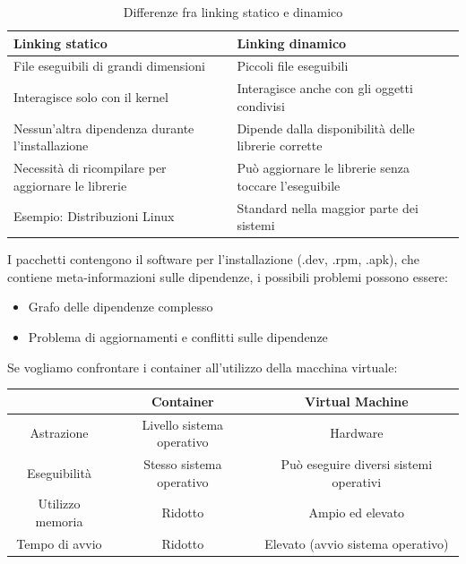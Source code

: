 \documentclass{article}
\begin{document}
		\begin{table}[h]
		    \centering
		    \begin{tabular}{|p{7.5cm}|p{7.5cm}|}
		         \hline
		         Linking statico & Linking dinamico \\[0.5ex]
		         \hline
		         File eseguibili di grandi dimensioni  & Piccoli file eseguibili \\
		         \hline
		         Interagisce solo con il kernel  & Interagisce anche con gli oggetti condivisi \\
		         \hline
		         Nessun'altra dipendenza durante l'installazione & Dipende dalla disponibilità 
		         delle librerie corrette \\
		         \hline
		         Necessità di ricompilare per aggiornare le librerie & Può aggiornare le librerie senza toccare l'eseguibile\\
		         \hline
		         Esempio: Distribuzioni Linux & Standard nella maggior parte dei sistemi\\
		        \hline
		    \end{tabular}
		    \caption{Differenze fra linking statico e dinamico}
		\end{table}
		I pacchetti contengono il software per l'installazione (.dev, .rpm, .apk), che contiene meta-informazioni sulle dipendenze, i possibili problemi possono essere:
		\begin{itemize}
		    \item Grafo delle dipendenze complesso
		    \item Problema di aggiornamenti e conflitti sulle dipendenze
		\end{itemize}
		Se vogliamo confrontare i container all'utilizzo della macchina virtuale:
		\begin{table}[h]
		    \centering
		    \begin{tabular}{|c|c|c|}
		        \hline
		               & {\Large Container} & {\Large Virtual Machine} \\
		        \hline
		            Astrazione & Livello sistema operativo & Hardware \\
		        \hline
		            Eseguibilità & Stesso sistema operativo & Può eseguire diversi sistemi operativi\\
		        \hline
		            Utilizzo memoria & Ridotto & Ampio ed elevato \\
		        \hline
		            Tempo di avvio & Ridotto & Elevato (avvio sistema operativo) \\
		        \hline         
		    \end{tabular}
		\end{table}
		
\end{document}
